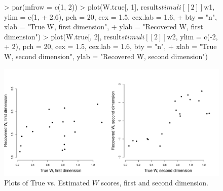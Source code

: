 \documentclass[nojss]{jss}
\begin{document}
\begin{figure}
\begin{center}
\begin{Schunk}
\begin{Sinput}
> par(mfrow = c(1, 2))
> plot(W.true[, 1], result$stimuli[[2]]$w1, ylim = c(1, 
+     2.6), pch = 20, cex = 1.5, cex.lab = 1.6, 
+     bty = "n", xlab = "True W, first dimension", 
+     ylab = "Recovered W, first dimension")
> plot(W.true[, 2], result$stimuli[[2]]$w2, ylim = c(-2, 
+     2), pch = 20, cex = 1.5, cex.lab = 1.6, bty = "n", 
+     xlab = "True W, second dimension", ylab = "Recovered W, second dimension")
\end{Sinput}
\end{Schunk}
\includegraphics{basicspace-six}
\end{center}
\caption{Plots of True vs. Estimated $W$ scores, first and second dimension.}
\label{fig:six}
\end{figure}
\end{document}
